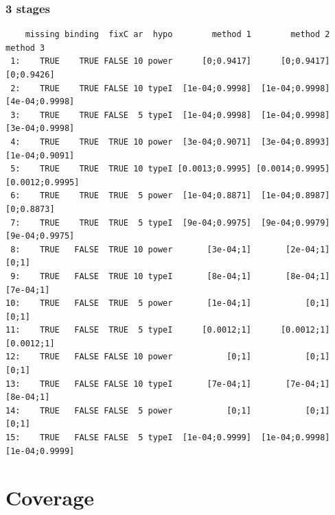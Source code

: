 \documentclass[12pt]{article}
\begin{document}
\subsubsection{3 stages}
\label{sec:orgce511ef}
\begin{verbatim}
    missing binding  fixC ar  hypo        method 1        method 2        method 3
 1:    TRUE    TRUE FALSE 10 power      [0;0.9417]      [0;0.9417]      [0;0.9426]
 2:    TRUE    TRUE FALSE 10 typeI  [1e-04;0.9998]  [1e-04;0.9998]  [4e-04;0.9998]
 3:    TRUE    TRUE FALSE  5 typeI  [1e-04;0.9998]  [1e-04;0.9998]  [3e-04;0.9998]
 4:    TRUE    TRUE  TRUE 10 power  [3e-04;0.9071]  [3e-04;0.8993]  [1e-04;0.9091]
 5:    TRUE    TRUE  TRUE 10 typeI [0.0013;0.9995] [0.0014;0.9995] [0.0012;0.9995]
 6:    TRUE    TRUE  TRUE  5 power  [1e-04;0.8871]  [1e-04;0.8987]      [0;0.8873]
 7:    TRUE    TRUE  TRUE  5 typeI  [9e-04;0.9975]  [9e-04;0.9979]  [9e-04;0.9975]
 8:    TRUE   FALSE  TRUE 10 power       [3e-04;1]       [2e-04;1]           [0;1]
 9:    TRUE   FALSE  TRUE 10 typeI       [8e-04;1]       [8e-04;1]       [7e-04;1]
10:    TRUE   FALSE  TRUE  5 power       [1e-04;1]           [0;1]           [0;1]
11:    TRUE   FALSE  TRUE  5 typeI      [0.0012;1]      [0.0012;1]      [0.0012;1]
12:    TRUE   FALSE FALSE 10 power           [0;1]           [0;1]           [0;1]
13:    TRUE   FALSE FALSE 10 typeI       [7e-04;1]       [7e-04;1]       [8e-04;1]
14:    TRUE   FALSE FALSE  5 power           [0;1]           [0;1]           [0;1]
15:    TRUE   FALSE FALSE  5 typeI  [1e-04;0.9999]  [1e-04;0.9998]  [1e-04;0.9999]
\end{verbatim}

\clearpage 
\section{Coverage}
\label{sec:org3af74a8}
\end{document}
